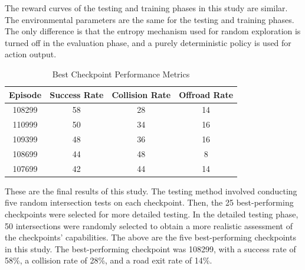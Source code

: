    The reward curves of the testing and training phases in this study are similar. The environmental parameters are the same for the testing and training phases. The only difference is that the entropy mechanism used for random exploration is turned off in the evaluation phase, and a purely deterministic policy is used for action output.

    \begin{table}[htbp]
    \centering
    \caption{Best Checkpoint Performance Metrics}
    \label{tab:performance_metrics}
    \begin{tabular}{cccc}
    \toprule
    \textbf{Episode} & \textbf{Success Rate} & \textbf{Collision Rate} & \textbf{Offroad Rate} \\ \midrule
    108299 & 58 & 28 & 14\\
    110999 & 50 & 34 & 16\\
    109399 & 48 & 36 & 16\\
    108699 & 44 & 48 & 8\\
    107699 & 42 & 44 & 14\\
    \bottomrule
    \end{tabular}
    \end{table}

    These are the final results of this study. The testing method involved conducting five random intersection tests on each checkpoint. Then, the 25 best-performing checkpoints were selected for more detailed testing. In the detailed testing phase, 50 intersections were randomly selected to obtain a more realistic assessment of the checkpoints' capabilities. The above are the five best-performing checkpoints in this study. The best-performing checkpoint was 108299, with a success rate of 58\%, a collision rate of 28\%, and a road exit rate of 14\%.